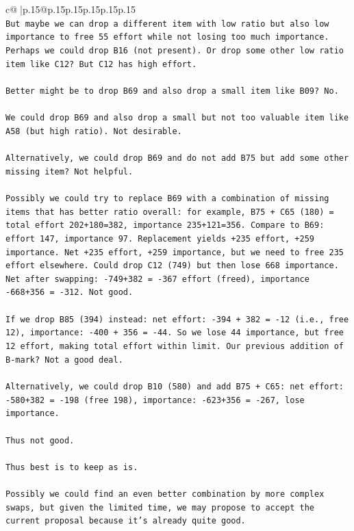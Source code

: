 \documentclass{article}
\begin{document}
{\begin{supertabular}{c@{$\;$}|p{.15\linewidth}@{}p{.15\linewidth}p{.15\linewidth}p{.15\linewidth}p{.15\linewidth}p{.15\linewidth}}
{{{\\ 
\texttt{But maybe we can drop a different item with low ratio but also low importance to free 55 effort while not losing too much importance. Perhaps we could drop B16 (not present). Or drop some other low ratio item like C12? But C12 has high effort.} \\
\\ 
\texttt{Better might be to drop B69 and also drop a small item like B09? No.} \\
\\ 
\texttt{We could drop B69 and also drop a small but not too valuable item like A58 (but high ratio). Not desirable.} \\
\\ 
\texttt{Alternatively, we could drop B69 and do not add B75 but add some other missing item? Not helpful.} \\
\\ 
\texttt{Possibly we could try to replace B69 with a combination of missing items that has better ratio overall: for example, B75 + C65 (180) = total effort 202+180=382, importance 235+121=356. Compare to B69: effort 147, importance 97. Replacement yields +235 effort, +259 importance. Net +235 effort, +259 importance, but we need to free 235 effort elsewhere. Could drop C12 (749) but then lose 668 importance. Net after swapping: {-}749+382 = {-}367 effort (freed), importance {-}668+356 = {-}312. Not good.} \\
\\ 
\texttt{If we drop B85 (394) instead: net effort: {-}394 + 382 = {-}12 (i.e., free 12), importance: {-}400 + 356 = {-}44. So we lose 44 importance, but free 12 effort, making total effort within limit. Our previous addition of B{-}mark? Not a good deal.} \\
\\ 
\texttt{Alternatively, we could drop B10 (580) and add B75 + C65: net effort: {-}580+382 = {-}198 (free 198), importance: {-}623+356 = {-}267, lose importance.} \\
\\ 
\texttt{Thus not good.} \\
\\ 
\texttt{Thus best is to keep as is.} \\
\\ 
\texttt{Possibly we could find an even better combination by more complex swaps, but given the limited time, we may propose to accept the current proposal because it's already quite good.} \\
}}}
\end{supertabular}}
\end{document}
